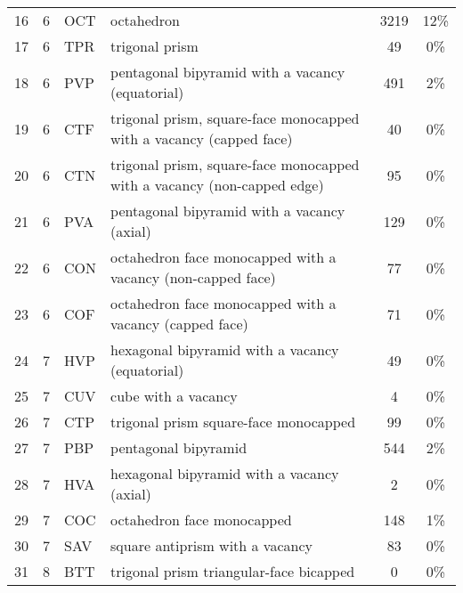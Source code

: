 \begin{tabular}{l l l l c c}
	16  & 6       & OCT   & octahedron                                                              & 3219      & 12\%     \\
	17  & 6       & TPR   & trigonal prism                                                          & 49        & 0\%      \\
	18  & 6       & PVP   & pentagonal bipyramid with a vacancy (equatorial)                        & 491       & 2\%      \\
	19  & 6       & CTF   & trigonal prism, square-face monocapped with a vacancy (capped face)     & 40        & 0\%      \\
	20  & 6       & CTN   & trigonal prism, square-face monocapped with a vacancy (non-capped edge) & 95        & 0\%      \\
	21  & 6       & PVA   & pentagonal bipyramid with a vacancy (axial)                             & 129       & 0\%      \\
	22  & 6       & CON   & octahedron face monocapped with a vacancy (non-capped face)             & 77        & 0\%      \\
	23  & 6       & COF   & octahedron face monocapped with a vacancy (capped face)                 & 71        & 0\%      \\
	24  & 7       & HVP   & hexagonal bipyramid with a vacancy (equatorial)                         & 49        & 0\%      \\
	25  & 7       & CUV   & cube with a vacancy                                                     & 4         & 0\%      \\
	26  & 7       & CTP   & trigonal prism square-face monocapped                                   & 99        & 0\%      \\
	27  & 7       & PBP   & pentagonal bipyramid                                                    & 544       & 2\%      \\
	28  & 7       & HVA   & hexagonal bipyramid with a vacancy (axial)                              & 2         & 0\%      \\
	29  & 7       & COC   & octahedron face monocapped                                              & 148       & 1\%      \\
	30  & 7       & SAV   & square antiprism with a vacancy                                         & 83        & 0\%      \\
	31  & 8       & BTT   & trigonal prism triangular-face bicapped                                 & 0         & 0\%      \\

\end{tabular}
